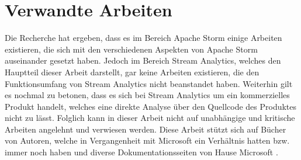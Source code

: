 \section{Verwandte Arbeiten}

Die Recherche hat ergeben, dass es im Bereich Apache Storm einige Arbeiten existieren, die sich mit den verschiedenen Aspekten von Apache Storm auseinander gesetzt haben. Jedoch im Bereich Stream Analytics, welches den Hauptteil dieser Arbeit darstellt, gar keine Arbeiten existieren, die den Funktionsumfang von Stream Analytics nicht beanstandet haben. Weiterhin gilt es nochmal zu betonen, dass es sich bei Stream Analytics um ein kommerzielles Produkt handelt, welches eine direkte Analyse über den Quellcode des Produktes nicht zu lässt. Folglich kann in dieser Arbeit nicht auf unabhängige und kritische Arbeiten angelehnt und verwiesen werden. Diese Arbeit stützt sich auf Bücher von Autoren, welche in Vergangenheit mit Microsoft ein Verhältnis hatten bzw. immer noch haben und diverse Dokumentationsseiten von Hause Microsoft \cite{Familiar.2017} \cite{Klein.2017}. 